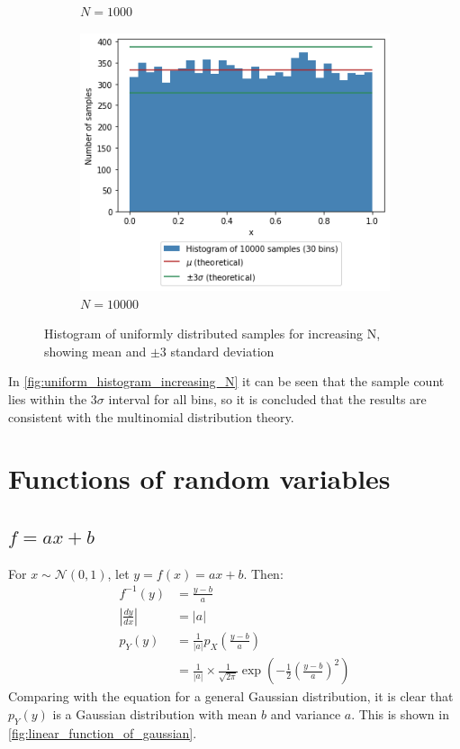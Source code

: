 \documentclass[a4paper]{article}
\begin{document}
\begin{figure}[h]
\begin{subfigure}[b]{0.3\textwidth}
        \caption{$N=1000$}
        \label{fig:uniform_histogram_1000}
    \end{subfigure}
    \hfill
    \begin{subfigure}[b]{0.3\textwidth}
        \centering
        \includegraphics[width=\textwidth]{figures/uniform_histogram_10000.png}
        \caption{$N=10000$}
        \label{fig:uniform_histogram_10000}
    \end{subfigure}
    \caption{Histogram of uniformly distributed samples for increasing N, showing mean and $\pm3$ standard deviation}
    \label{fig:uniform_histogram_increasing_N}
\end{figure}

In \autoref{fig:uniform_histogram_increasing_N} it can be seen that the sample count lies within the $3\sigma$ interval
for all bins, so it is concluded that the results are consistent with the multinomial distribution theory.


\section{Functions of random variables}

\subsection{$f = a x + b$}
For $x \sim \mathcal{N}(0, 1)$, let $y = f(x) = a x + b$. Then:
\begin{align*}
    f^{-1}(y) &= \frac{y - b}{a} \\
    \left|\frac{dy}{dx}\right| &= |a| \\
    p_Y(y) &= \frac{1}{|a|} p_X \left( \frac{y - b}{a} \right) \\
    &= \frac{1}{|a|}\times\frac{1}{\sqrt{2\pi}} \exp{\left( -\frac{1}{2} \left( \frac{y-b}{a} \right)^2 \right)}
\end{align*}
Comparing with the equation for a general Gaussian distribution, it is clear that $p_Y(y)$ is a Gaussian distribution
with mean $b$ and variance $a$. This is shown in \autoref{fig:linear_function_of_gaussian}.
\end{document}
